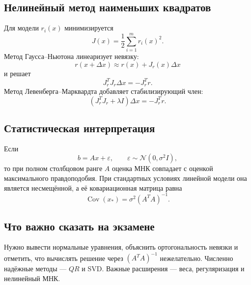 \subsection{Нелинейный метод наименьших квадратов}

Для модели $r_i(x)$ минимизируется
\[
    J(x)=\frac12\sum_{i=1}^{m}r_i(x)^2.
\]
Метод Гаусса--Ньютона линеаризует невязку:
\[
    r(x+\Delta x)\approx r(x)+J_r(x)\Delta x
\]
и решает
\[
    J_r^TJ_r\Delta x=-J_r^Tr.
\]
Метод Левенберга--Марквардта добавляет стабилизирующий член:
\[
    (J_r^TJ_r+\lambda I)\Delta x=-J_r^Tr.
\]

\subsection{Статистическая интерпретация}

Если
\[
    b=Ax+\varepsilon,
    \qquad
    \varepsilon\sim\mathcal N(0,\sigma^2I),
\]
то при полном столбцовом ранге $A$ оценка МНК совпадает с оценкой максимального
правдоподобия. При стандартных условиях линейной модели она является несмещённой,
а её ковариационная матрица равна
\[
    \operatorname{Cov}(x_*)=\sigma^2(A^TA)^{-1}.
\]

\subsection{Что важно сказать на экзамене}

Нужно вывести нормальные уравнения, объяснить ортогональность невязки и отметить,
что вычислять решение через $(A^TA)^{-1}$ нежелательно. Численно надёжные методы
--- $QR$ и SVD. Важные расширения --- веса, регуляризация и нелинейный МНК.

\newpage
